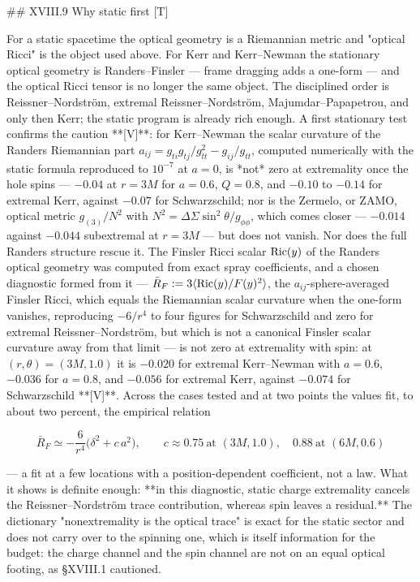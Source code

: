 ## XVIII.9 Why static first [T]

For a static spacetime the optical geometry is a Riemannian metric and "optical Ricci" is the object used above. For Kerr and Kerr–Newman the stationary optical geometry is Randers–Finsler — frame dragging adds a one-form — and the optical Ricci tensor is no longer the same object. The disciplined order is Reissner–Nordström, extremal Reissner–Nordström, Majumdar–Papapetrou, and only then Kerr; the static program is already rich enough. A first stationary test confirms the caution **[V]**: for Kerr–Newman the scalar curvature of the Randers Riemannian part $a_{ij} = g_{ti}g_{tj}/g_{tt}^2-g_{ij}/g_{tt}$, computed numerically with the static formula reproduced to $10^{-7}$ at $a = 0$, is *not* zero at extremality once the hole spins — $-0.04$ at $r = 3M$ for $a = 0.6$, $Q = 0.8$, and $-0.10$ to $-0.14$ for extremal Kerr, against $-0.07$ for Schwarzschild; nor is the Zermelo, or ZAMO, optical metric $g_{(3)}/N^2$ with $N^2 = \Delta\Sigma\sin^2\theta/g_{\phi\phi}$, which comes closer — $-0.014$ against $-0.044$ subextremal at $r = 3M$ — but does not vanish. Nor does the full Randers structure rescue it. The Finsler Ricci scalar ${\rm Ric}(y)$ of the Randers optical geometry was computed from exact spray coefficients, and a chosen diagnostic formed from it — $\bar R_F := 3\langle{\rm Ric}(y)/F(y)^2\rangle$, the $a_{ij}$-sphere-averaged Finsler Ricci, which equals the Riemannian scalar curvature when the one-form vanishes, reproducing $-6/r^4$ to four figures for Schwarzschild and zero for extremal Reissner–Nordström, but which is not a canonical Finsler scalar curvature away from that limit — is not zero at extremality with spin: at $(r,\theta) = (3M,1.0)$ it is $-0.020$ for extremal Kerr–Newman with $a = 0.6$, $-0.036$ for $a = 0.8$, and $-0.056$ for extremal Kerr, against $-0.074$ for Schwarzschild **[V]**. Across the cases tested and at two points the values fit, to about two percent, the empirical relation

$$\bar R_F\simeq-\frac{6}{r^4}\big(\delta^2+c\,a^2\big),\qquad c\approx0.75\ \text{at }(3M,1.0),\quad 0.88\ \text{at }(6M,0.6)$$

— a fit at a few locations with a position-dependent coefficient, not a law. What it shows is definite enough: **in this diagnostic, static charge extremality cancels the Reissner–Nordström trace contribution, whereas spin leaves a residual.** The dictionary "nonextremality is the optical trace" is exact for the static sector and does not carry over to the spinning one, which is itself information for the budget: the charge channel and the spin channel are not on an equal optical footing, as §XVIII.1 cautioned.

